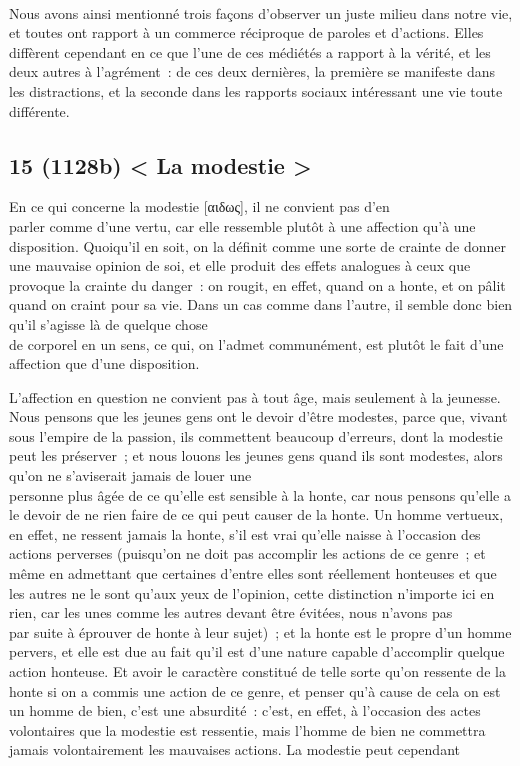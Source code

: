 \documentclass[french,twoside]{book} %
\begin{document}
\\
Nous avons ainsi mentionné trois façons d’observer un juste milieu dans notre vie, et toutes ont rapport à un commerce réciproque de paroles et d’actions. Elles diffèrent cependant en ce que l’une de ces médiétés a rapport à la vérité, et les deux autres à l’agrément : de ces deux dernières, la première se manifeste dans les distractions, et la seconde dans les rapports sociaux intéressant une vie toute différente.
\subsection[{15 (1128b) < La modestie >}]{15 (1128b) < La modestie >}
\noindent En ce qui concerne la modestie [αιδως], il ne convient pas d’en \\
parler comme d’une vertu, car elle ressemble plutôt à une affection qu’à une disposition. Quoiqu’il en soit, on la définit comme une sorte de crainte de donner une mauvaise opinion de soi, et elle produit des effets analogues à ceux que provoque la crainte du danger : on rougit, en effet, quand on a honte, et on pâlit quand on craint pour sa vie. Dans un cas comme dans l’autre, il semble donc bien qu’il s’agisse là de quelque chose \\
de corporel en un sens, ce qui, on l’admet communément, est plutôt le fait d’une affection que d’une disposition.\par
L’affection en question ne convient pas à tout âge, mais seulement à la jeunesse. Nous pensons que les jeunes gens ont le devoir d’être modestes, parce que, vivant sous l’empire de la passion, ils commettent beaucoup d’erreurs, dont la modestie peut les préserver ; et nous louons les jeunes gens quand ils sont modestes, alors qu’on ne s’aviserait jamais de louer une \\
personne plus âgée de ce qu’elle est sensible à la honte, car nous pensons qu’elle a le devoir de ne rien faire de ce qui peut causer de la honte. Un homme vertueux, en effet, ne ressent jamais la honte, s’il est vrai qu’elle naisse à l’occasion des actions perverses (puisqu’on ne doit pas accomplir les actions de ce genre ; et même en admettant que certaines d’entre elles sont réellement honteuses et que les autres ne le sont qu’aux yeux de l’opinion, cette distinction n’importe ici en rien, car les unes comme les autres devant être évitées, nous n’avons pas \\
par suite à éprouver de honte à leur sujet) ; et la honte est le propre d’un homme pervers, et elle est due au fait qu’il est d’une nature capable d’accomplir quelque action honteuse. Et avoir le caractère constitué de telle sorte qu’on ressente de la honte si on a commis une action de ce genre, et penser qu’à cause de cela on est un homme de bien, c’est une absurdité : c’est, en effet, à l’occasion des actes volontaires que la modestie est ressentie, mais l’homme de bien ne commettra jamais volontairement les mauvaises actions. La modestie peut cependant \\
\end{document}
